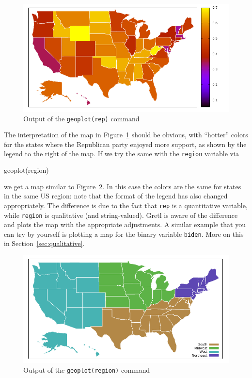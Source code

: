 \documentclass{article}
\begin{document}
\begin{figure}[htbp]
  \centering
  \includegraphics[scale=0.75]{us2020-rep}
  \caption{Output of the \texttt{geoplot(rep)} command}
  \label{fig:us2020-rep}
\end{figure}

The interpretation of the map in Figure~\ref{fig:us2020-rep} should be
obvious, with ``hotter'' colors for the states where the Republican
party enjoyed more support, as shown by the legend to the right of the
map. If we try the same with the \texttt{region} variable via
\begin{code}
  geoplot(region)
\end{code}
we get a map similar to Figure~\ref{fig:us2020-reg}. In this case the
colors are the same for states in the same US region: note that the
format of the legend has also changed appropriately. The difference is
due to the fact that \texttt{rep} is a quantitative variable, while
\texttt{region} is qualitative (and string-valued). Gretl is aware of
the difference and plots the map with the appropriate adjustments. A
similar example that you can try by yourself is plotting a map for the
binary variable \texttt{biden}. More on this in
Section~\ref{sec:qualitative}.

\begin{figure}[htbp]
  \centering
  \includegraphics[scale=0.75]{us2020-reg}
  \caption{Output of the \texttt{geoplot(region)} command}
  \label{fig:us2020-reg}
\end{figure}
\end{document}
